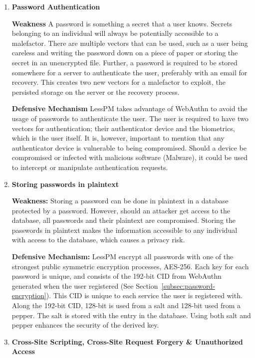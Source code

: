 \begin{enumerate}[label=$\blacktriangleright$]
  \item \textbf{Password Authentication}

  \textbf{Weakness}
  A password is something a secret that a user knows.
  Secrets belonging to an individual will always be potentially accessible to
  a malefactor.
  There are multiple vectors that can be used, such as a user being careless
  and writing the password down on a piece of paper or storing the secret in an
  unencrypted file.
  Further, a password is required to be stored somewhere for a server to
  authenticate the user, preferably with an email for recovery.
  This creates two new vectors for a malefactor to exploit, the persisted
  storage on the server or the recovery process.

  \textbf{Defensive Mechanism}
  LessPM takes advantage of WebAuthn to avoid the usage of passwords to
  authenticate the user.
  The user is required to have two vectors for authentication; their
  authenticator device and the biometrics, which is the user itself.
  It is, however, important to mention that any authenticator device is
  vulnerable to being compromised.
  Should a device be compromised or infected with malicious software (Malware),
  it could be used to intercept or manipulate authentication requests.

  \item \textbf{Storing passwords in plaintext}

  \textbf{Weakness:}
  Storing a password can be done in plaintext in a database protected by a
  password.
  However, should an attacker get access to the database, all passwords and
  their plaintext are compromised.
  Storing the passwords in plaintext makes the information accessible to any
  individual with access to the database, which causes a privacy risk.

  \textbf{Defensive Mechanism:}
  LessPM encrypt all passwords with one of the strongest public symmetric
  encryption processes, AES-256.
  Each key for each password is unique, and consists of the 192-bit CID from
  WebAuthn generated when the user registered (See
  Section~\ref{subsec:password-encryption}).
  This CID is unique to each service the user is registered with.
  Along the 192-bit CID, 128-bit is used from a salt and 128-bit used from a
  pepper.
  The salt is stored with the entry in the database.
  Using both salt and pepper enhances the security of the derived key.

  \item \textbf{
    Cross-Site Scripting,
    Cross-Site Request Forgery
    \& Unauthorized Access}


\end{enumerate}
